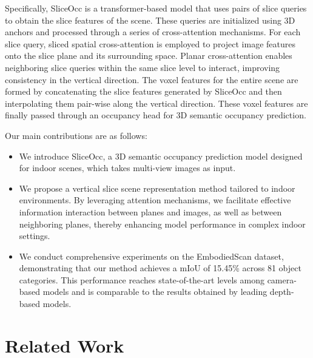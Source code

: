 \documentclass[letterpaper, 10 pt, conference]{ieeeconf}  %
\begin{document}
Specifically, SliceOcc is a transformer-based model that uses pairs of slice queries to obtain the slice features of the scene. These queries are initialized using 3D anchors and processed through a series of cross-attention mechanisms. For each slice query, sliced spatial cross-attention is employed to project image features onto the slice plane and its surrounding space. Planar cross-attention enables neighboring slice queries within the same slice level to interact, improving consistency in the vertical direction. The voxel features for the entire scene are formed by concatenating the slice features generated by SliceOcc and then interpolating them pair-wise along the vertical direction. These voxel features are finally passed through an occupancy head for 3D semantic occupancy prediction.

Our main contributions are as follows:

\begin{itemize}
\item We introduce SliceOcc, a 3D semantic occupancy prediction model designed for indoor scenes, which takes multi-view images as input.
\item We propose a vertical slice scene representation method tailored to indoor environments. By leveraging attention mechanisms, we facilitate effective information interaction between planes and images, as well as between neighboring planes, thereby enhancing model performance in complex indoor settings.
\item We conduct comprehensive experiments on the EmbodiedScan dataset, demonstrating that our method achieves a mIoU of 15.45\% across 81 object categories. This performance reaches state-of-the-art levels among camera-based models and is comparable to the results obtained by leading depth-based models.
\end{itemize}
\vspace{-3pt}
\section{Related Work}
\end{document}
